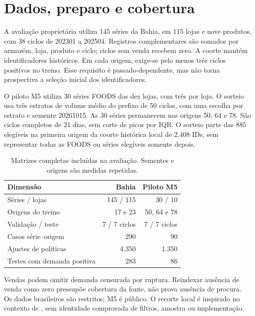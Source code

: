 \section{Dados, preparo e cobertura}
\label{sec:pipeline_experimental}\label{sec:ba2026_methods}
A avaliação proprietária utiliza 145 séries da Bahia, em 115 lojas e nove produtos, com 38 ciclos de 202301 a 202504. Registros complementares são somados por armazém, loja, produto e ciclo; ciclos sem venda recebem zero. A coorte mantém identificadores históricos. Em cada origem, exige-se pelo menos três ciclos positivos no treino. Esse requisito é passado-dependente, mas não torna prospectiva a seleção inicial dos identificadores.

O piloto M5 utiliza 30 séries FOODS das dez lojas, com três por loja. O sorteio usa três estratos de volume médio do prefixo de 50 ciclos, com uma escolha por estrato e semente 20261015. As 30 séries permanecem nas origens 50, 64 e 78. São ciclos completos de 21 dias, sem corte de picos por IQR. O sorteio parte das 885 elegíveis na primeira origem da coorte histórica local de 2.408 IDs, sem representar todas as FOODS ou séries elegíveis somente depois.

\begin{table}[htbp]\centering\small
\caption{Matrizes completas incluídas na avaliação. Sementes e origens são medidas repetidas.}\label{tab:temporal_coverage}
\begin{tabular}{@{}lrr@{}}\toprule
Dimensão & Bahia & Piloto M5\\\midrule
Séries / lojas & 145 / 115 & 30 / 10\\
Origens do treino & 17 e 23 & 50, 64 e 78\\
Validação / teste & 7 / 7 ciclos & 7 / 7 ciclos\\
Casos série--origem & 290 & 90\\
Ajustes de políticas & 4.350 & 1.350\\
Testes com demanda positiva & 283 & 86\\\bottomrule
\end{tabular}\end{table}

Vendas podem omitir demanda censurada por ruptura. Reindexar ausência de venda como zero pressupõe cobertura da fonte, não prova ausência de procura. Os dados brasileiros são restritos; M5 é público. O recorte local é inspirado no contexto de \citet{Zabraoui2025GaDQN}, sem identidade comprovada de filtros, amostra ou implementação.

